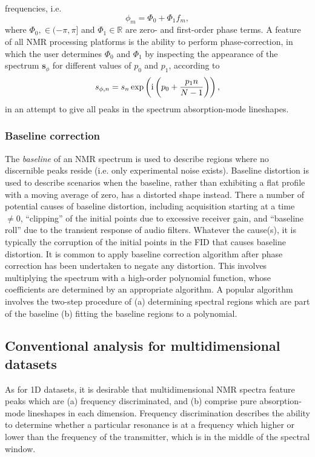 frequencies, i.e.
\begin{equation}
    \phi_m = \Phi_0 + \Phi_1 f_m,
\end{equation}
where $\Phi_0, \in (-\pi, \pi]$ and $\Phi_1 \in \mathbb{R}$ are zero- and
first-order phase terms. A feature of all \ac{NMR} processing platforms is the
ability to perform phase-correction, in which the user determines
$\Phi_0$ and $\Phi_1$ by inspecting the appearance of the spectrum
$\symbf{s}_{\phi}$ for different values of $p_0$ and  $p_1$, according to
\begin{equation}
    s_{\phi,n} = s_n
    \exp\left(\mathrm{i} \left(p_0 + \frac{p_1 n}{N - 1}\right)\right),
\end{equation}
in an attempt to give all peaks in the spectrum absorption-mode lineshapes.

\subsubsection{Baseline correction}
The \emph{baseline} of an \ac{NMR} spectrum is used to describe regions where
no discernible peaks reside (i.e. only experimental noise exists).
Baseline distortion is used to describe scenarios when the baseline, rather
than exhibiting a flat profile with a moving average of zero, has a distorted
shape instead. There a number of potential causes of baseline distortion,
including acquisition starting at a time $\neq 0$, ``clipping'' of the initial
points due to excessive receiver gain, and ``baseline roll'' due to the
transient response of audio filters\parencites[Section~3.3]{Cavanagh2007}{Tang1994}.
Whatever the cause(s), it is typically the corruption of the initial points in the
\ac{FID} that causes baseline distortion.
It is common to apply baseline correction algorithm after phase correction has
been undertaken to negate any distortion. This involves multiplying
the spectrum with a high-order polynomial function, whose coefficients are
determined by an appropriate algorithm. A popular algorithm
involves the two-step procedure of (a) determining spectral regions which are
part of the baseline (b) fitting the baseline regions to a
polynomial\cite{Dietrich1991,Cobas2006}.

\subsection{Conventional analysis for multidimensional datasets}
\label{subsec:mulitdim}
As for \ac{1D} datasets, it is desirable that multidimensional \ac{NMR} spectra
feature peaks which are (a) frequency discriminated, and (b) comprise pure
absorption-mode lineshapes in each dimension. Frequency discrimination describes
the ability to determine whether a particular resonance is at a frequency which
higher or lower than the frequency of the transmitter, which is in the middle
of the spectral window.

